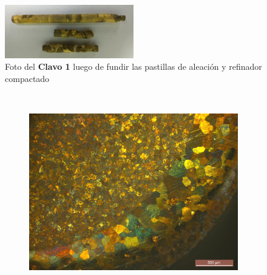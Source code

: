 \documentclass[a4paper,12pt,fleqn,twoside,openany]{book}
\begin{document}
 \begin{figure}[h]
 \centering
 \includegraphics[width=0.5\textwidth]{Img/Resultados/clavos/Clavo1_Foto2.jpg}
 \caption{Foto del \textbf{Clavo 1} luego de fundir las pastillas de aleación y refinador compactado} 
 \label{fig: Clavo1}
 \end{figure}




  \begin{figure}%
    \centering
    
    ~ %
    \begin{subfigure}{0.35\textwidth}
        \includegraphics[width=\textwidth]{Img/Resultados/clavos/Clavo1.jpg}
        \caption{}%
        \label{fig: MicroClavo1}
    \end{subfigure}
        \begin{subfigure}{0.3\textwidth}

\end{subfigure}
\end{figure}
\end{document}
